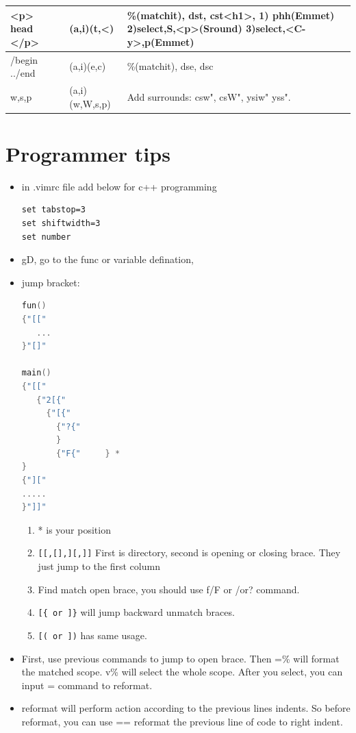 \documentclass[a4paper,12pt,twoside]{book}
\begin{document}
\begin{itemize}
\begin{tabular}{p{}|p{}|p{}}
\hline 
<p> head </p> & (a,i)(t,<) & \%(matchit), dst, cst<h1>, 1) phh(Emmet) 2)select,S,<p>(Sround) 3)select,<C-y>,p(Emmet) \\

\hline
/begin ../end & (a,i)(e,c) & \%(matchit), dse, dsc \\

\hline 
w,s,p & (a,i)(w,W,s,p) & Add surrounds: csw", csW", ysiw" yss".  \\

\hline 
\end{tabular}

\section{Programmer tips}
\begin{itemize}
 	\item in .vimrc file add below for c++ programming
	\begin{verbatim}
set tabstop=3
set shiftwidth=3
set number	
	\end{verbatim}
	 
	\item gD, go to the func or variable defination, 
	\item jump bracket:
\begin{lstlisting}[frame=single, language=c++]
fun()
{"[["
   ...
}"[]"

main()
{"[["
   {"2[{"
	 {"[{" 
	   {"?{"
	   }
	   {"F{"     } *
}
{"]["
.....
}"]]"
\end{lstlisting}

\begin{enumerate}
		\item * is your position
		\item \verb=[[,[],][,]]= First is directory, second is opening or closing brace. They just jump to the first column
		\item Find match open brace, you should use f/F or /or? command. 
		\item \verb=[{ or ]}= will jump backward unmatch braces. 
		\item \verb=[( or ])= has same usage.
\end{enumerate}

\item First, use previous commands to jump to open brace. Then =\% will format the matched scope. v\% will select the whole scope.  After you select, you can input = command to reformat. 
\item reformat will perform action according to the previous lines indents. So before reformat, you can use == reformat the previous line of code to right indent.


\end{itemize}
\end{itemize}
\end{document}
